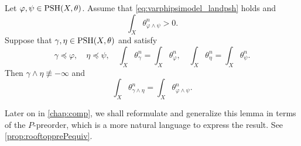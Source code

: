 \begin{lemma}\label{lma:landcorrectmass}
    Let $\varphi,\psi\in \mathrm{PSH}(X,\theta)$. Assume that \eqref{eq:varphipsimodel_landpsh} holds and
    \[
    \int_X \theta_{\varphi\land \psi}^n>0.
    \]
    Suppose that $\gamma,\eta\in \mathrm{PSH}(X,\theta)$ and satisfy
    \[
    \gamma\preceq \varphi,\quad \eta\preceq \psi,\quad \int_X \theta_{\gamma}^n=\int_X \theta_{\varphi}^n,\quad \int_X \theta_{\eta}^n=\int_X \theta_{\psi}^n.
    \]
    Then $\gamma\land \eta\not\equiv -\infty$ and
    \begin{equation}\label{eq:thetagammaeta_temp1}
    \int_X \theta_{\gamma\land \eta}^n=\int_X \theta_{\varphi\land \psi}^n.
    \end{equation}
\end{lemma}
Later on in \cref{chap:comp}, we shall reformulate and generalize this lemma in terms of the $P$-preorder, which is a more natural language to express the result. See \cref{prop:rooftopprePequiv}.
